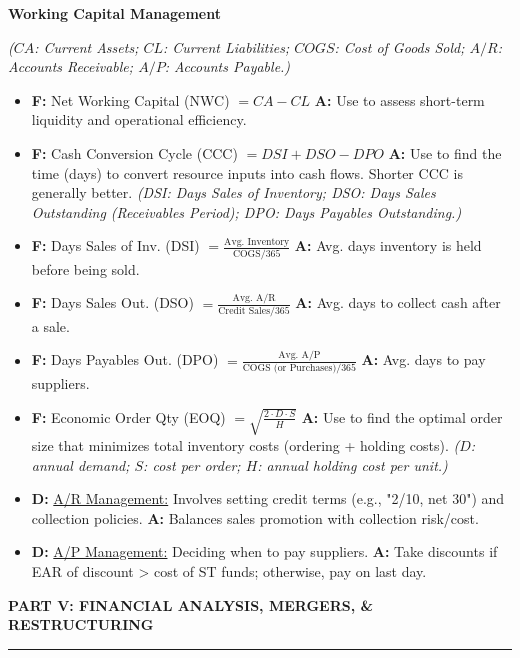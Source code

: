 \documentclass[7pt,landscape]{extarticle} %
\newcommand{\cheatsheetsection}[1]{%
  \vspace{0.25ex plus 0.1ex minus 0.05ex}%
  \noindent\color{SecTitleColor}\textbf{\sffamily\small\MakeUppercase{#1}}%
  \par\vspace{0.02ex}%
  {\color{RuleColor}\hrule height 0.3pt}\par\vspace{0.15ex}%
}
\newcommand{\cheatsheetsubsubsection}[1]{%
  \vspace{0.15ex plus 0.05ex minus 0.05ex}%
  \noindent\textbf{\sffamily\scriptsize #1}%
  \par\vspace{0.05ex}%
}
\newcommand{\D}[1]{\textbf{\textcolor{DefColor}{D:}} \uline{#1}}
\newcommand{\F}[1]{\textbf{\textcolor{FormColor}{F:}} #1}
\newcommand{\A}[1]{\textbf{\textcolor{AppColor}{A:}} #1}
\newcommand{\SF}[1]{\textit{\small (#1)}} %
\begin{document}
\begin{multicols*}{4}
  \cheatsheetsubsubsection{Working Capital Management}
  \SF{$CA$: Current Assets; $CL$: Current Liabilities; $COGS$: Cost of Goods Sold; $A/R$: Accounts Receivable; $A/P$: Accounts Payable.}
  \begin{itemize}
    \item \F{Net Working Capital (NWC) $= CA - CL$}
          \A{Use to assess short-term liquidity and operational efficiency.}
    \item \F{Cash Conversion Cycle (CCC) $= DSI + DSO - DPO$}
          \A{Use to find the time (days) to convert resource inputs into cash flows. Shorter CCC is generally better.}
          \SF{DSI: Days Sales of Inventory; DSO: Days Sales Outstanding (Receivables Period); DPO: Days Payables Outstanding.}
    \item \F{Days Sales of Inv. (DSI) $= \frac{\text{Avg. Inventory}}{\text{COGS}/365}$}
          \A{Avg. days inventory is held before being sold.}
    \item \F{Days Sales Out. (DSO) $= \frac{\text{Avg. A/R}}{\text{Credit Sales}/365}$}
          \A{Avg. days to collect cash after a sale.}
    \item \F{Days Payables Out. (DPO) $= \frac{\text{Avg. A/P}}{\text{COGS (or Purchases)}/365}$}
          \A{Avg. days to pay suppliers.}
    \item \F{Economic Order Qty (EOQ) $= \sqrt{\frac{2 \cdot D \cdot S}{H}}$}
          \A{Use to find the optimal order size that minimizes total inventory costs (ordering + holding costs).}
          \SF{$D$: annual demand; $S$: cost per order; $H$: annual holding cost per unit.}
    \item \D{A/R Management:} Involves setting credit terms (e.g., "2/10, net 30") and collection policies. \A{Balances sales promotion with collection risk/cost.}
    \item \D{A/P Management:} Deciding when to pay suppliers. \A{Take discounts if EAR of discount > cost of ST funds; otherwise, pay on last day.}
  \end{itemize}

  \cheatsheetsection{Part V: Financial Analysis, Mergers, \& Restructuring}
  

\end{multicols*}
\end{document}
